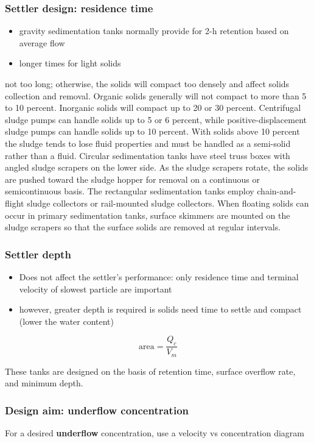 \begin{frame}\frametitle{Settler design: residence time}
	\begin{itemize}
		\item	gravity sedimentation tanks normally provide for 2-h retention based on average flow
		\item	longer times for light solids
	\end{itemize}
not too long; otherwise, the solids will compact too densely and affect solids collection and removal. Organic solids generally will not compact to more than 5 to 10 percent. Inorganic solids will compact up to 20 or 30 percent. Centrifugal sludge pumps can handle solids up to 5 or 6 percent, while positive-displacement sludge pumps can handle solids up to 10 percent. With solids above 10 percent the sludge tends to lose fluid properties and must be handled as a semi-solid rather than a fluid. Circular sedimentation tanks have steel truss boxes with angled sludge scrapers on the lower side. As the sludge scrapers rotate, the solids are pushed toward the sludge hopper for removal on a continuous or semicontinuous basis. The rectangular sedimentation tanks employ chain-and-flight sludge collectors or rail-mounted sludge collectors. When floating solids can occur in primary sedimentation tanks, surface skimmers are mounted on the sludge scrapers so that the surface solids are removed at regular intervals.
	
\end{frame}

\begin{frame}\frametitle{Settler depth}
	\begin{itemize}
		\item	Does not affect the settler's performance: only residence time and terminal velocity of slowest particle are important
		\item	however, greater depth is required is solids need time to settle and compact (lower the water content)
	\end{itemize}
	
	\[
		\text{area} = \frac{Q_c}{V_m}
	\]
	
	
	\vspace{12pt}
	These tanks are designed on the basis of retention time, surface overflow rate, and minimum depth. 
\end{frame}

\begin{frame}\frametitle{Design aim: \textbf{underflow} concentration }
	For a desired  \textbf{underflow} concentration, use a velocity vs concentration diagram
	
\end{frame}

